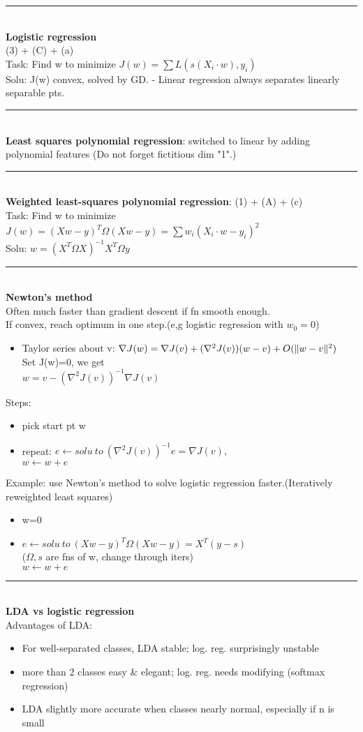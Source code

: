\documentclass[10pt,landscape]{article}
\newcommand{\ruler}{\\\rule{\columnwidth}{0.25pt}\\}
\newcommand{\rulermy}{\rule{\columnwidth}{0.25pt}\\}
\begin{document}
\begin{multicols*}{3}
\rulermy
\textbf{Logistic regression}\\
(3) + (C) + (a) \\
Task: Find w to minimize 
$J(w) = \sum L(s(X_i\cdot w), y_i)$ \\
Solu: J(w) convex, solved by GD.
- Linear regression always separates linearly separable pts.  
\ruler
\textbf{Least squares polynomial regression}: switched to linear by adding polynomial features (Do not forget fictitious dim "1".)

\rulermy
\textbf{Weighted least-squares polynomial regression}:
(1) + (A) + (c) \\
Task: Find w to minimize $J(w) = (Xw-y)^T \Omega (Xw-y) = \sum w_i(X_i \cdot w - y_i)^2$ \\
Solu: $w = (X^T \Omega X)^{-1}X^T \Omega y$ 

\rulermy
\textbf{Newton’s method} \\
Often much faster than gradient descent if fn smooth enough. \\
If convex, reach optimum in one step.(e,g logistic regression with $w_0=0$) \\
\begin{itemize}
	\item[] 
	Taylor series about v:
	$ \nabla J(w) = \nabla J(v) + (\nabla ^2 J(v)) (w-v) + O(\|w-v\|^2) $ \\
	Set J(w)=0, we get \\
	$ w = v - (\nabla ^2 J(v))^{-1} \nabla J(v)$
\end{itemize}
Steps:
\begin{itemize}
	\item 
	pick start pt w
	\item 
	repeat: $e \leftarrow solu\ to\ (\nabla ^2 J(v))^{-1}e =  \nabla J(v), $\\
	$w\leftarrow w+e$
\end{itemize}
Example: use Newton’s method to solve logistic regression faster.(Iteratively reweighted least squares)
\begin{itemize}
	\item 
	w=0
	\item 
	$e \leftarrow solu\ to\ (Xw-y)^T \Omega (Xw-y) = X^T(y-s)$ \\
	($\Omega,s$ are fns of w, change through iters) \\
	$w\leftarrow w+e$\\
\end{itemize}
\rulermy
\textbf{LDA vs logistic regression}\\
Advantages of LDA:
\begin{itemize}
	\item 
	For well-separated classes, LDA stable; log. reg. surprisingly unstable\\
	\item
	more than 2 classes easy \& elegant; log. reg. needs modifying (softmax regression)
	\item
	LDA slightly more accurate when classes nearly normal, especially if n is small\\
\end{itemize}


\end{multicols*}
\end{document}
